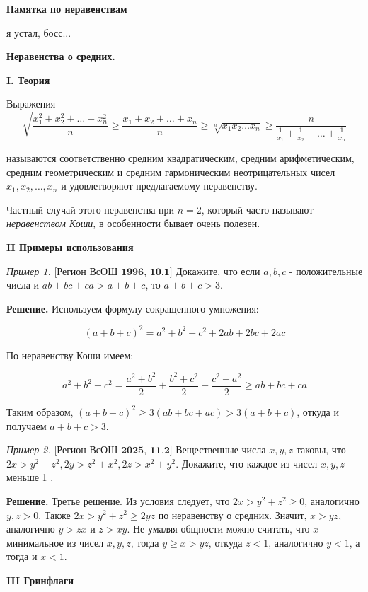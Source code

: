 \centerline{\bf \Huge Памятка по неравенствам}

\begin{flushright}
        \scriptsize{я устал, босс...}
\end{flushright}

\textbf{\Large Неравенства о средних.}

\textbf{I. Теория}

Выражения
$$
\sqrt{\frac{x_1^2+x_2^2+\ldots+x_n^2}{n}} \geqslant \frac{x_1+x_2+\ldots+x_n}{n} \geqslant \sqrt[n]{x_1 x_2 \ldots x_n} \geqslant \frac{n}{\frac{1}{x_1}+\frac{1}{x_2}+\ldots+\frac{1}{x_n}}
$$


называются соответственно средним квадратическим, средним арифметическим, средним геометрическим и средним гармоническим неотрицательных чисел $x_1, x_2, \ldots, x_n$ и удовлетворяют предлагаемому неравенству.

Частный случай этого неравенства при $n=2$, который часто называют \textit{неравенством Коши}, в особенности бывает очень полезен. 

\textbf{II Примеры использования}

\textit{Пример 1.}
$\bigl[\textbf{Регион ВсОШ 1996, 10.1}\bigr]$
Докажите, что если $a, b, c$ - положительные числа и $a b+b c+c a>a+b+c$, то $a+b+c>3$.

\textbf{Решение.}
Используем формулу сокращенного умножения:

$$
(a+b+c)^2=a^2+b^2+c^2+2 a b+2 b c+2 a c
$$


По неравенству Коши имеем:

$$
a^2+b^2+c^2=\frac{a^2+b^2}{2}+\frac{b^2+c^2}{2}+\frac{c^2+a^2}{2} \geqslant a b+b c+c a
$$


Таким образом, $(a+b+c)^2 \geqslant 3(a b+b c+a c)>3(a+b+c)$, откуда и получаем $a+b+c>3$.

\textit{Пример 2.}
$\bigl[\textbf{Регион ВсОШ 2025, 11.2}\bigr]$
Вещественные числа $x, y, z$ таковы, что $2 x>y^2+z^2, 2 y>z^2+x^2, 2 z>x^2+y^2$. Докажите, что каждое из чисел $x, y, z$ меньше 1 .

\textbf{Решение.}
Третье решение. Из условия следует, что $2 x>y^2+z^2 \geqslant 0$, аналогично $y, z>0$. Также $2 x>y^2+z^2 \geqslant 2 y z$ по неравенству о средних. Значит, $x>y z$, аналогично $y>z x$ и $z>x y$. Не умаляя общности можно считать, что $x$ - минимальное из чисел $x, y, z$, тогда $y \geqslant x>y z$, откуда $z<1$, аналогично $y<1$, а тогда и $x<1$.

\textbf{III Гринфлаги}

